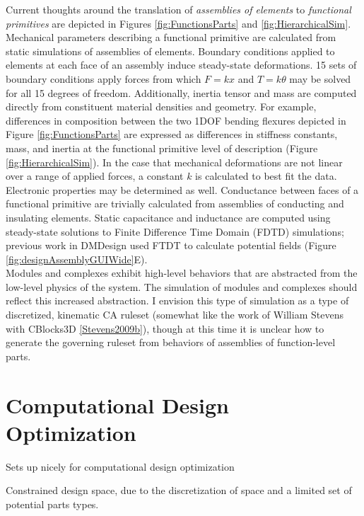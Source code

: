 {Current thoughts around the translation of \textit{assemblies of elements} to \textit{functional primitives} are depicted in Figures \ref{fig:FunctionsParts} and \ref{fig:HierarchicalSim}.  Mechanical parameters describing a functional primitive are calculated from static simulations of assemblies of elements.  Boundary conditions applied to elements at each face of an assembly induce steady-state deformations.  15 sets of boundary conditions apply forces from which $F = kx$ and $T = k\theta$ may be solved for all 15 degrees of freedom.  Additionally, inertia tensor and mass are computed directly from constituent material densities and geometry.  For example, differences in composition between the two 1DOF bending flexures depicted in Figure \ref{fig:FunctionsParts} are expressed as differences in stiffness constants, mass, and inertia at the functional primitive level of description (Figure \ref{fig:HierarchicalSim}).  In the case that mechanical deformations are not linear over a range of applied forces, a constant $k$ is calculated to best fit the data.  \\

Electronic properties may be determined as well.  Conductance between faces of a functional primitive are trivially calculated from assemblies of conducting and insulating elements.  Static capacitance and inductance are computed using steady-state solutions to Finite Difference Time Domain (FDTD) simulations; previous work in DMDesign used FTDT to calculate potential fields (Figure \ref{fig:designAssemblyGUIWide}E).\\

Modules and complexes exhibit high-level behaviors that are abstracted from the low-level physics of the system.  The simulation of modules and complexes should reflect this increased abstraction.  I envision this type of simulation as a type of discretized, kinematic CA ruleset (somewhat like the work of William Stevens with CBlocks3D \ref{Stevens2009b}), though at this time it is unclear how to generate the governing ruleset from behaviors of assemblies of function-level parts.

\section{Computational Design Optimization}

Sets up nicely for computational design optimization

Constrained design space, due to the discretization of space and a limited set of potential parts types.

}
